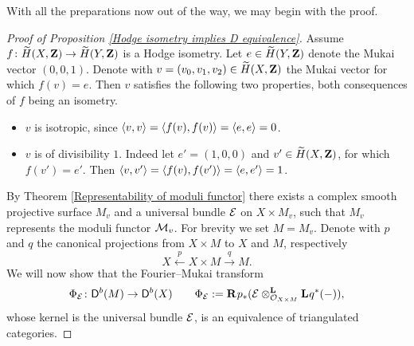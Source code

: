 \noindent
With all the preparations now out of the way, we may begin with the proof.
\begin{proof}[Proof of Proposition \ref{Hodge isometry implies D equivalence}]
    Assume $f \colon \mukai{X} \to \mukai{Y}$ is a Hodge isometry. Let $e \in \mukai{Y}$ denote the Mukai vector $(0,0,1)$. Denote with $v =(v_0, v_1, v_2) \in \mukai{X}$ the Mukai vector for which $f(v) = e$. Then $v$ satisfies the following two properties, both consequences of $f$ being an isometry.
    \begin{itemize}[label = $\vartriangleright$]
        \item{$v$ is isotropic, since $\pairing{v}{v} = \pairing{f(v)}{f(v)} = \pairing{e}{e} = 0$.}
        \item {$v$ is of divisibility $1$. Indeed let $e' = (1, 0, 0)$ and $v'\in \mukai{X}$, for which $f(v') = e'$. Then $\pairing{v}{v'} = \pairing{f(v)}{f(v')} = \pairing{e}{e'} = 1$.
        }
    \end{itemize}
    By Theorem \ref{Representability of moduli functor} there exists a complex smooth projective surface $M_v$ and a universal bundle $\E$ on $X \times M_v$, such that $M_v$ represents the moduli functor $\M_v$. For brevity we set $M = M_v$. Denote with $p$ and $q$ the canonical projections from $X \times M$ to $X$ and $M$, respectively
    \[
        X \xleftarrow{\ p \ } X \times M \xrightarrow{\ q \ } M.
    \]
    We will now show that the Fourier--Mukai transform 
    \[
        \fm{\E} \colon \derb{M} \to \derb{X} \qquad \fm{\E} := \rderived{}{p_*}(\derivedtensor{\E}{\lderived{}{q^*}(-)}{\struct{X \times M}}),
    \]
    whose kernel is the universal bundle $\E$, is an equivalence of triangulated categories. 


\end{proof}
